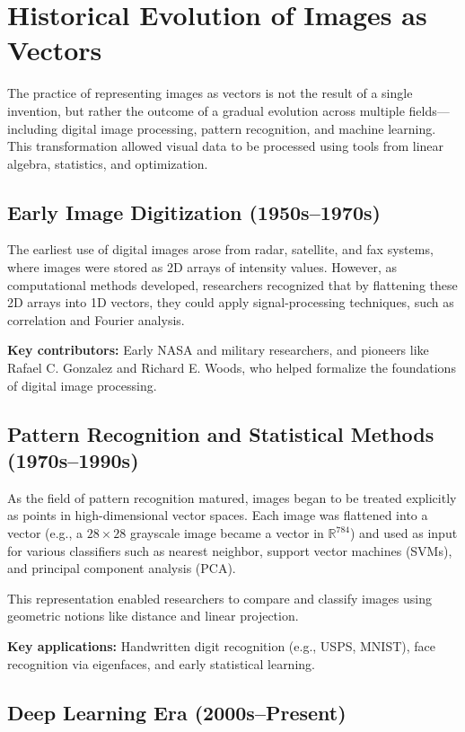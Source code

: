 \section{Historical Evolution of Images as Vectors}

The practice of representing images as vectors is not the result of a single invention, but rather the outcome of a gradual evolution across multiple fields—including digital image processing, pattern recognition, and machine learning. This transformation allowed visual data to be processed using tools from linear algebra, statistics, and optimization.

\subsection{Early Image Digitization (1950s--1970s)}

The earliest use of digital images arose from radar, satellite, and fax systems, where images were stored as 2D arrays of intensity values. However, as computational methods developed, researchers recognized that by flattening these 2D arrays into 1D vectors, they could apply signal-processing techniques, such as correlation and Fourier analysis.

\textbf{Key contributors:} Early NASA and military researchers, and pioneers like Rafael C. Gonzalez and Richard E. Woods, who helped formalize the foundations of digital image processing.

\subsection{Pattern Recognition and Statistical Methods (1970s--1990s)}

As the field of pattern recognition matured, images began to be treated explicitly as points in high-dimensional vector spaces. Each image was flattened into a vector (e.g., a $28 \times 28$ grayscale image became a vector in $\mathbb{R}^{784}$) and used as input for various classifiers such as nearest neighbor, support vector machines (SVMs), and principal component analysis (PCA).

This representation enabled researchers to compare and classify images using geometric notions like distance and linear projection.

\textbf{Key applications:} Handwritten digit recognition (e.g., USPS, MNIST), face recognition via eigenfaces, and early statistical learning.

\subsection{Deep Learning Era (2000s--Present)}

